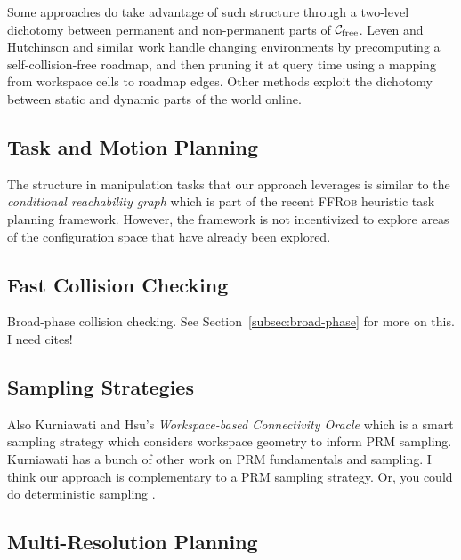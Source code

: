 Some approaches do take advantage of such structure
through a two-level dichotomy between
permanent and non-permanent parts of
$\mathcal{C}_{\mbox{\scriptsize free}}$.
Leven and Hutchinson \cite{leven2000changing}
and similar work \cite{kallman2004dynamicroadmaps}
handle changing environments by
precomputing a self-collision-free roadmap,
and then pruning it at query time
using a mapping from workspace cells to roadmap edges.
Other methods \cite{jaillet2004dynamicprm}
exploit the dichotomy between static and dynamic parts of
the world online.

\subsection{Task and Motion Planning}

The structure in manipulation tasks that our approach leverages
is similar to the \emph{conditional reachability graph} which is
part of the recent \textsc{FFRob} heuristic task planning framework.
However, the framework is not incentivized to explore
areas of the configuration space that have already been explored.

\subsection{Fast Collision Checking}

Broad-phase collision checking.
See Section~\ref{subsec:broad-phase} for more on this.
I need cites!

\subsection{Sampling Strategies}

Also Kurniawati and Hsu's
\emph{Workspace-based Connectivity Oracle}
\cite{kurniawati2008workconnoracle}
which is a smart sampling strategy which considers workspace
geometry to inform PRM sampling.
Kurniawati has a bunch of other work on PRM fundamentals and sampling.
I think our approach is complementary to a PRM sampling strategy.
Or, you could do deterministic sampling
\cite{lavalle2002gridprms} \cite{geraerts2002prmcomparison}.

\subsection{Multi-Resolution Planning}


